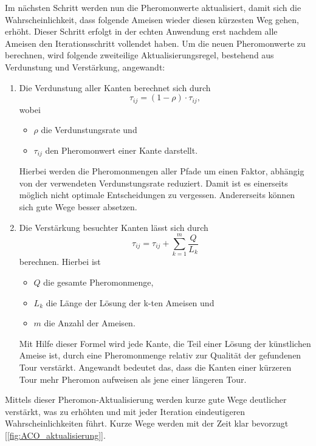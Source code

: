\documentclass[pdftex,
               12pt,
               DIV=12,
               a4paper,
               twoside,
               parskip=half,
               abstract=true,
               dvipsnames]{scrartcl}
\begin{document}
Im n\"achsten Schritt werden nun die Pheromonwerte aktualisiert, damit sich die Wahrscheinlichkeit, dass folgende Ameisen wieder diesen k\"urzesten Weg gehen, erh\"oht. Dieser Schritt erfolgt in der echten Anwendung erst nachdem alle Ameisen den Iterationsschritt vollendet haben. Um die neuen Pheromonwerte zu berechnen, wird folgende zweiteilige Aktualisierungsregel, bestehend aus Verdunstung und Verst\"arkung, angewandt:
\begin{enumerate}
	\item Die Verdunstung aller Kanten berechnet sich durch
	\[\tau_{ij} = (1 - \rho) \cdot \tau_{ij},\]
	wobei
	\begin{itemize}
		\item $\rho$ die Verdunstungsrate und
		\item $\tau_{ij}$ den Pheromonwert einer Kante darstellt.
	\end{itemize}
	Hierbei werden die Pheromonmengen aller Pfade um einen Faktor, abh\"angig von der verwendeten Verdunstungsrate reduziert. Damit ist es einerseits m\"oglich nicht optimale Entscheidungen zu vergessen. Andererseits k\"onnen sich gute Wege besser absetzen.
	\item Die Verst\"arkung besuchter Kanten l\"asst sich durch
	\[\tau_{ij} = \tau_{ij} + \sum_{k=1}^{m}\frac{Q}{L_k}\]
	berechnen. Hierbei ist
	\begin{itemize}
		\item $Q$ die gesamte Pheromonmenge,
		\item $L_k$ die L\"ange der L\"osung der k-ten Ameisen und
		\item $m$ die Anzahl der Ameisen.
	\end{itemize}
	Mit Hilfe dieser Formel wird jede Kante, die Teil einer L\"osung der k\"unstlichen Ameise ist, durch eine Pheromonmenge relativ zur Qualit\"at der gefundenen Tour verst\"arkt. Angewandt bedeutet das, dass die Kanten einer k\"urzeren Tour mehr Pheromon aufweisen als jene einer l\"angeren Tour.
\end{enumerate}

Mittels dieser Pheromon-Aktualisierung werden kurze gute Wege deutlicher verst\"arkt, was zu erh\"ohten und mit jeder Iteration eindeutigeren Wahrscheinlichkeiten f\"uhrt. Kurze Wege werden mit der Zeit klar bevorzugt [\cref{fig:ACO_aktualisierung}]. \cite[vgl.][]{DorigoStuetzle04}
\end{document}
